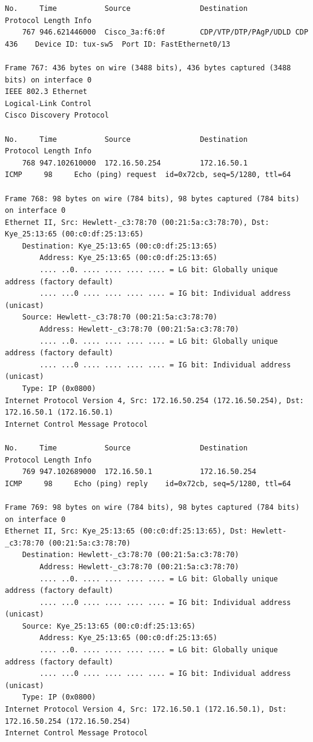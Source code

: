 \documentclass[a4paper,11pt]{article}
\begin{document}
\begin{lstlisting}
No.     Time           Source                Destination           Protocol Length Info
    767 946.621446000  Cisco_3a:f6:0f        CDP/VTP/DTP/PAgP/UDLD CDP      436    Device ID: tux-sw5  Port ID: FastEthernet0/13  

Frame 767: 436 bytes on wire (3488 bits), 436 bytes captured (3488 bits) on interface 0
IEEE 802.3 Ethernet 
Logical-Link Control
Cisco Discovery Protocol

No.     Time           Source                Destination           Protocol Length Info
    768 947.102610000  172.16.50.254         172.16.50.1           ICMP     98     Echo (ping) request  id=0x72cb, seq=5/1280, ttl=64

Frame 768: 98 bytes on wire (784 bits), 98 bytes captured (784 bits) on interface 0
Ethernet II, Src: Hewlett-_c3:78:70 (00:21:5a:c3:78:70), Dst: Kye_25:13:65 (00:c0:df:25:13:65)
    Destination: Kye_25:13:65 (00:c0:df:25:13:65)
        Address: Kye_25:13:65 (00:c0:df:25:13:65)
        .... ..0. .... .... .... .... = LG bit: Globally unique address (factory default)
        .... ...0 .... .... .... .... = IG bit: Individual address (unicast)
    Source: Hewlett-_c3:78:70 (00:21:5a:c3:78:70)
        Address: Hewlett-_c3:78:70 (00:21:5a:c3:78:70)
        .... ..0. .... .... .... .... = LG bit: Globally unique address (factory default)
        .... ...0 .... .... .... .... = IG bit: Individual address (unicast)
    Type: IP (0x0800)
Internet Protocol Version 4, Src: 172.16.50.254 (172.16.50.254), Dst: 172.16.50.1 (172.16.50.1)
Internet Control Message Protocol

No.     Time           Source                Destination           Protocol Length Info
    769 947.102689000  172.16.50.1           172.16.50.254         ICMP     98     Echo (ping) reply    id=0x72cb, seq=5/1280, ttl=64

Frame 769: 98 bytes on wire (784 bits), 98 bytes captured (784 bits) on interface 0
Ethernet II, Src: Kye_25:13:65 (00:c0:df:25:13:65), Dst: Hewlett-_c3:78:70 (00:21:5a:c3:78:70)
    Destination: Hewlett-_c3:78:70 (00:21:5a:c3:78:70)
        Address: Hewlett-_c3:78:70 (00:21:5a:c3:78:70)
        .... ..0. .... .... .... .... = LG bit: Globally unique address (factory default)
        .... ...0 .... .... .... .... = IG bit: Individual address (unicast)
    Source: Kye_25:13:65 (00:c0:df:25:13:65)
        Address: Kye_25:13:65 (00:c0:df:25:13:65)
        .... ..0. .... .... .... .... = LG bit: Globally unique address (factory default)
        .... ...0 .... .... .... .... = IG bit: Individual address (unicast)
    Type: IP (0x0800)
Internet Protocol Version 4, Src: 172.16.50.1 (172.16.50.1), Dst: 172.16.50.254 (172.16.50.254)
Internet Control Message Protocol


\end{lstlisting}
\end{document}
